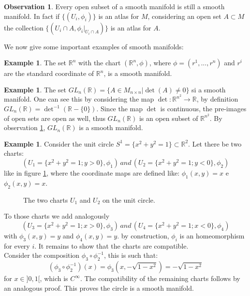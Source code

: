 \documentclass[12pt,a4paper]{report}
\theoremstyle{definition}
\theoremstyle{Theorem}
\theoremstyle{definition}
\newtheorem{Ex}[Def]{Example}
\theoremstyle{definition}
\newtheorem{Obs}[Def]{Observation}
\begin{document}
	\begin{Obs}\label{Obs:1.1.1}
		Every open subset of a smooth manifold is still a smooth manifold. In fact if $\{(U_i,\phi_i)\}$ is an atlas for $M$, considering an open set $A\subset M$ the collection $\{(U_i\cap A,\phi_i|_{U_i\cap A})\}$ is an atlas for $A$.
	\end{Obs}
	We now give some important examples of smooth manifolds:
	\begin{Ex}
		The set $\mathbb{R}^n$ with the chart $(\mathbb{R}^n,\phi)$, where $\phi=(r^1,...,r^n)$ and $r^i$ are the standard coordinate of $\mathbb{R}^n$, is a smooth manifold.
	\end{Ex}
	\begin{Ex}\label{Ex 1.1}
		The set $GL_n(\mathbb{R})=\{A\in M_{n\times n}|\det(A)\neq0\}$ si a smooth manifold. One can see this by considering the map $\det:\mathbb{R}^{n^2}\rightarrow \mathbb{R}$, by definition $GL_n(\mathbb{R})=\det^{-1}(\mathbb{R}-\{0\})$. Since the map $\det$ is continuous, the pre-images of open sets are open as well, thus $GL_n(\mathbb{R})$ is an open subset of $\mathbb{R}^{n^2}$. By observation \ref{Obs:1.1.1}, $GL_n(\mathbb{R})$ is a smooth manifold.
	\end{Ex}
	\begin{Ex}
		Consider the unit circle $S^1=\{x^2+y^2=1\}\subset \mathbb{R}^2$. Let there be two charts: $$(U_1=\{x^2+y^2=1;y>0\},\phi_1) \, and \,  (U_2=\{x^2+y^2=1;y<0\},\phi_2)$$ like in figure \ref{figura 1}, where the coordinate maps are defined like: $\phi_1(x,y)=x$ e $\phi_2(x,y)=x$.
		\begin{figure}[H]
			\centering
			\label{figura 1}
			\caption{The two charts $U_1$ and $U_2$ on the unit circle.}
		\end{figure}
		To those charts we add analogously $$(U_3=\{x^2+y^2=1;x>0\},\phi_3)\, and \, (U_4=\{x^2+y^2=1;x<0\},\phi_4)$$ with $\phi_3(x,y)=y$ and $\phi_4(x,y)=y$. by construction, $\phi_i$ is an homeomorphism for every $i$. It remains to show that the charts are compatible.\\
		Consider the composition $\phi_3\circ\phi_2^{-1}$, this is such that: $$(\phi_3\circ\phi_2^{-1})(x)=\phi_3(x,-\sqrt{1-x^2})=-\sqrt{1-x^2}$$ for $x\in ]0,1[$, which is $C^\infty$. The compatibility of the remaining charts follows by an analogous proof. This proves the circle is a smooth manifold.
	\end{Ex}
\end{document}
